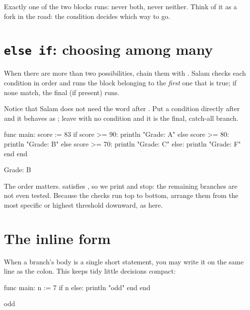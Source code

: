 Exactly one of the two blocks runs: never both, never neither. Think of it as a
fork in the road: the condition decides which way to go.

\section{\texttt{else if}: choosing among many}

When there are more than two possibilities, chain them with . Salam
checks each condition in order and runs the block belonging to the \emph{first}
one that is true; if none match, the final  (if present) runs.

\begin{tip}
Notice that Salam does not need the word  after . Put a
condition directly after  and it behaves as ; leave
 with no condition and it is the final, catch-all branch. %
\end{tip}

\begin{salamen}
func main:
    score := 83
    if score >= 90:
        println "Grade: A"
    else score >= 80:
        println "Grade: B"
    else score >= 70:
        println "Grade: C"
    else:
        println "Grade: F"
    end
end
\end{salamen}

\begin{progout}
Grade: B
\end{progout}

The order matters.  satisfies , so we print  and
stop: the remaining branches are not even tested. Because the checks run top
to bottom, arrange them from the most specific or highest threshold downward, as
here.

\section{The inline form}

When a branch's body is a single short statement, you may write it on the same
line as the colon. This keeps tidy little decisions compact:

\begin{salamen}
func main:
    n := 7
    if n %
    else:          println "odd"
    end
end
\end{salamen}

\begin{progout}
odd
\end{progout}

